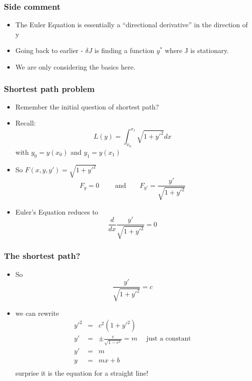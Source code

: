 \documentclass[10pt]{beamer}
\begin{document}
\begin{frame}
  \frametitle{Side comment}
  \begin{itemize}
  \item The Euler Equation is essentially a ``directional derivative''
    in the direction of y
  \item Going back to earlier - $\delta J$ is finding a function $y^*$
    where J is stationary. 
  \item We are only considering the basics here. 
  \end{itemize}
\end{frame}

\begin{frame}
  \frametitle{Shortest path problem}
  \begin{itemize}
  \item Remember the initial question of shortest path? 
  \item Recall:
    \[
      L(y) = \int_{x_0}^{x_1} \sqrt{1 + y'^2} dx
    \] with $y_0 = y(x_0)$ and $y_1 = y(x_1)$
  \item So $F(x, y, y') = \sqrt{1 + y'^2}$
    \[
      F_y = 0 \mbox{~~~~~~ and ~~~~~} F_{y'} = \frac{y'}{\sqrt{1+y'^2}}
    \]    
  \item Euler's Equation reduces to
    \[
      \frac{d}{dx} \frac{y'}{ \sqrt{1+y'^2} } = 0
    \]
  \end{itemize}
\end{frame}

\begin{frame}
  \frametitle{The shortest path?}
  \begin{itemize}
  \item So 
    \[
      \frac{ y' }{ \sqrt{1+y'^2} } = c
    \]
  \item we can rewrite
    \[
      \begin{array}{rcl}
        y'^2& = & c^2 (1+y'^2)\\ 
        y'  & = & \pm \frac{c}{\sqrt{1-c^2}} = m \mbox{ ~~ just a constant} \\ 
        y'  & = & m\\ 
        y   & = & mx + b \\ 
      \end{array}
    \]
    surprise it is the equation for a straight line!
    
  \end{itemize}
\end{frame}
\end{document}
